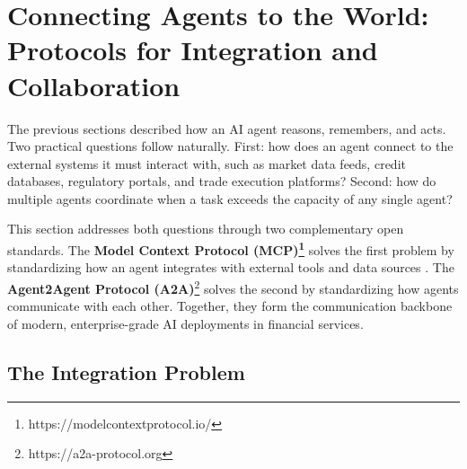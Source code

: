 \documentclass{article}
\begin{document}



\section{Connecting Agents to the World: Protocols for Integration and Collaboration}
\label{sec:agent-protocols}

The previous sections described how an AI agent reasons, remembers, and acts. Two practical questions follow naturally. First: how does an agent connect to the external systems it must interact with, such as market data feeds, credit databases, regulatory portals, and trade execution platforms? Second: how do multiple agents coordinate when a task exceeds the capacity of any single agent?

This section addresses both questions through two complementary open standards. The \textbf{Model Context Protocol (MCP)\footnote{https://modelcontextprotocol.io/}} solves the first problem by standardizing how an agent integrates with external tools and data sources \cite{hou2025model}. The \textbf{Agent2Agent Protocol (A2A)}\footnote{https://a2a-protocol.org} solves the second by standardizing how agents communicate with each other. Together, they form the communication backbone of modern, enterprise-grade AI deployments in financial services. 

\subsection{The Integration Problem}
\label{sec:mcp-integration-problem}
\end{document}
